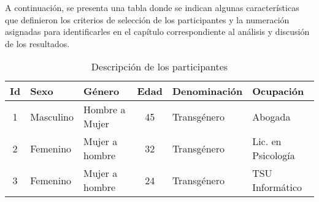 A continuación, se presenta una tabla donde se indican algunas características
que definieron los criterios de selección de los participantes y la numeración
asignadas para identificarles en el capítulo correspondiente al análisis y
discusión de los resultados.

\begin{table}[]
    \centering
    \caption{Descripción de los participantes}
    \label{tab:participantes}
    \renewcommand{\tabcolsep}{1pt}
    \begin{tabularx}{\textwidth}{@{}cXXcXX@{}}
    \toprule
    Id & Sexo & Género         & Edad & Denominación & Ocupación
    \\ \midrule
    1            & Masculino      & Hombre a Mujer & 45   & Transgénero      & Abogada            \\
    2            & Femenino       & Mujer a hombre & 32   & Transgénero      & Lic. en Psicología \\
    3            & Femenino       & Mujer a hombre & 24   & Transgénero      & TSU Informático    \\ \bottomrule
    \end{tabularx}
\end{table}

